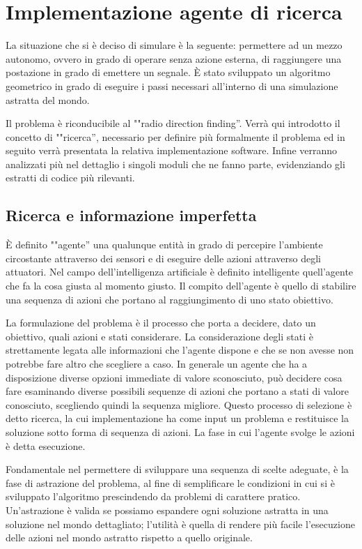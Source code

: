 \chapter{Implementazione agente di ricerca}
La situazione che si è deciso di simulare è la seguente: permettere ad un mezzo autonomo, ovvero in grado di operare senza azione esterna, di raggiungere una postazione in grado di emettere un segnale. È stato sviluppato un algoritmo geometrico in grado di eseguire i passi necessari all'interno di una simulazione astratta del mondo. 

Il problema è riconducibile al ""radio direction finding''. Verrà qui introdotto il concetto di ""ricerca'', necessario per definire più formalmente il problema ed in seguito verrà presentata la relativa implementazione software. Infine verranno analizzati più nel dettaglio i singoli moduli che ne fanno parte, evidenziando gli estratti di codice più rilevanti.

\section{Ricerca e informazione imperfetta}
È definito ""agente'' una qualunque entità in grado di percepire l'ambiente circostante attraverso dei sensori e di eseguire delle azioni attraverso degli attuatori. Nel campo dell'intelligenza artificiale è definito intelligente quell'agente che fa la cosa giusta al momento giusto. Il compito dell'agente è quello di stabilire una sequenza di azioni che portano al raggiungimento di uno stato obiettivo. 

La formulazione del problema è il processo che porta a decidere, dato un obiettivo, quali azioni e stati considerare. La considerazione degli stati è strettamente legata alle informazioni che l'agente dispone e che se non avesse non potrebbe fare altro che scegliere a caso. In generale un agente che ha a disposizione diverse opzioni immediate di valore sconosciuto, può decidere cosa fare esaminando diverse possibili sequenze di azioni che portano a stati di valore conosciuto, scegliendo quindi la sequenza migliore. Questo processo di selezione è detto ricerca, la cui implementazione ha come input un problema e restituisce la soluzione sotto forma di sequenza di azioni. La fase in cui l'agente svolge le azioni è detta esecuzione.

Fondamentale nel permettere di sviluppare una sequenza di scelte adeguate, è la fase di astrazione del problema, al fine di semplificare le condizioni in cui si è sviluppato l'algoritmo prescindendo da problemi di carattere pratico. Un'astrazione è valida se possiamo espandere ogni soluzione astratta in una soluzione nel mondo dettagliato; l'utilità è quella di rendere più facile l'esecuzione delle azioni nel mondo astratto rispetto a quello originale. 

